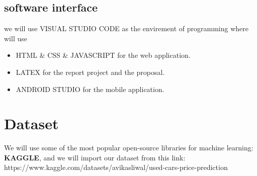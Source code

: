 \documentclass[]{report}   %
\begin{document}
\subsection{software interface}
we will use VISUAL STUDIO CODE as the envirement of programming where will use 
\begin{itemize}
  \item [\ding{228}] HTML \& CSS \& JAVASCRIPT for the web application.\\ 
  \item [\ding{228}]  LATEX for the report project and the proposal.\\
  \item [\ding{228}]  ANDROID STUDIO for the mobile application.\\
\end{itemize}
\section{Dataset} %
We will use some of the most popular open-source libraries for machine learning: 
\textbf{KAGGLE}, and we will import our dataset from this link: 
https://www.kaggle.com/datasets/avikasliwal/used-cars-price-prediction
\end{document}
